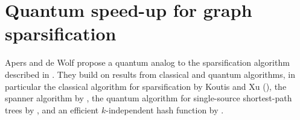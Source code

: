 \section{Quantum speed-up for graph sparsification}

Apers and de Wolf propose a quantum analog to the sparsification algorithm described in 
. They build on results from classical 
and quantum algorithms, in particular the classical algorithm for sparsification by Koutis and Xu (), the spanner algorithm by \citeauthor{Thorup_Zwick_2005} \cite{Thorup_Zwick_2005}, the quantum algorithm for single-source shortest-path trees by 
\citeauthor{Durr_Heiligman_2006} \cite{Durr_Heiligman_2006}, and an efficient $k$-independent hash function 
by \citeauthor{christiani_independence_2015} \cite{christiani_independence_2015}.








